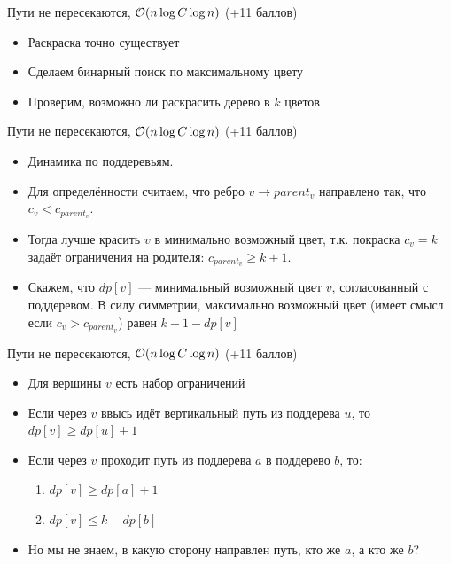 \begin{frame}{Пути не пересекаются, $\mathcal{O}(n \log C \log n)$ (+11 баллов)}
  \begin{itemize}
    \item Раскраска точно существует
    \item Сделаем бинарный поиск по максимальному цвету
    \item Проверим, возможно ли раскрасить дерево в $k$ цветов
  \end{itemize}
\end{frame}

\begin{frame}{Пути не пересекаются, $\mathcal{O}(n \log C \log n)$ (+11 баллов)}
  \begin{itemize}
    \vspace{-1em}
  \item Динамика по поддеревьям.
  \item Для определённости считаем, что ребро $v \rightarrow parent_v$ направлено так, что $c_v < c_{parent_v}$.
  \item Тогда лучше красить $v$ в минимально возможный цвет, т.к. покраска $c_v = k$ задаёт ограничения на родителя:
    $c_{parent_v} \ge k + 1$.
  \item Скажем, что $dp[v]$ --- минимальный возможный цвет $v$, согласованный с поддеревом.
    В силу симметрии, максимально возможный цвет (имеет смысл если $c_v > c_{parent_v}$) равен $k + 1 - dp[v]$
  \end{itemize}
\end{frame}

\begin{frame}{Пути не пересекаются, $\mathcal{O}(n \log C \log n)$ (+11 баллов)}
  \begin{itemize}
    \item Для вершины $v$ есть набор ограничений
    \item Если через $v$ ввысь идёт вертикальный путь из поддерева $u$, то $dp[v] \ge dp[u] + 1$
    \item Если через $v$ проходит путь из поддерева $a$ в поддерево $b$, то:
    \begin{enumerate}
        \item $dp[v] \ge dp[a] + 1$
        \item $dp[v] \le k - dp[b]$
    \end{enumerate}
    \item Но мы не знаем, в какую сторону направлен путь, кто же $a$, а кто же $b$?
  \end{itemize}
\end{frame}

